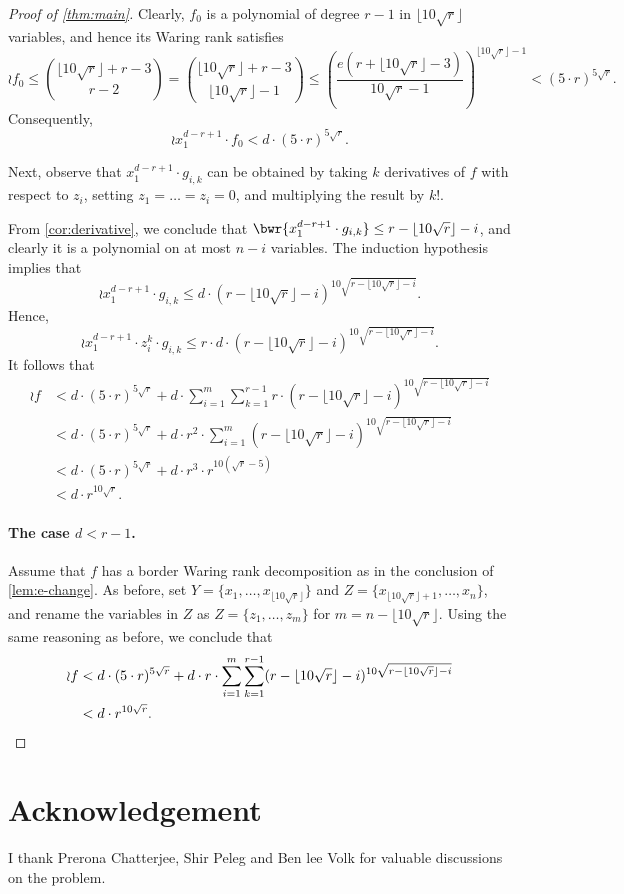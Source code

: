 \documentclass{article}
\begin{document}
\begin{proof}[Proof of \autoref{thm:main}]
    Clearly, $f_0$ is a polynomial of degree $r-1$ in $\lfloor 10\sqrt{r} \rfloor$ variables, and hence its Waring rank satisfies
    \[
    \wr{f_0} \leq \binom{\lfloor 10\sqrt{r} \rfloor + r - 3}{r-2} = \binom{\lfloor 10\sqrt{r} \rfloor + r - 3}{\lfloor 10\sqrt{r} \rfloor - 1} \leq \left(\frac{e(r + \lfloor 10\sqrt{r} \rfloor - 3)}{10\sqrt{r} - 1}\right)^{\lfloor 10\sqrt{r} \rfloor - 1} < (5 \cdot r)^{5\sqrt{r}}.
    \]
    Consequently, 
    \[
    \wr{x_1^{d-r+1} \cdot f_0} < d \cdot (5 \cdot r)^{5\sqrt{r}}.
    \]
 
    Next, observe that $x_1^{d-r+1} \cdot g_{i,k}$ can be obtained by taking $k$ derivatives of $f$ with respect to $z_i$, setting $z_1 = \ldots = z_i = 0$, and multiplying the result by $k!$. 
    
    From \autoref{cor:derivative}, we conclude that $\bwr{x_1^{d-r+1} \cdot g_{i,k}} \leq r - \lfloor 10\sqrt{r} \rfloor - i$, and clearly it is a polynomial on at most $n - i$ variables. The induction hypothesis implies that
    \[
    \wr{x_1^{d-r+1}\cdot  g_{i,k}} \leq d \cdot  (r - \lfloor 10\sqrt{r} \rfloor - i)^{10\sqrt{r - \lfloor 10\sqrt{r} \rfloor - i}}.
    \]
    Hence,
    \[
    \wr{x_1^{d-r+1}\cdot z_i^k\cdot  g_{i,k}} \leq r\cdot d \cdot  (r - \lfloor 10\sqrt{r} \rfloor - i)^{10\sqrt{r - \lfloor 10\sqrt{r} \rfloor - i}}.
    \]
    It follows that    
    \begin{align*}
    \wr{f} &< d \cdot (5 \cdot r)^{5\sqrt{r}} + d \cdot \sum_{i=1}^{m} \sum_{k=1}^{r-1} r\cdot (r - \lfloor 10\sqrt{r} \rfloor - i)^{10\sqrt{r - \lfloor 10\sqrt{r} \rfloor - i}} \\
    &< d \cdot (5 \cdot r)^{5\sqrt{r}} + d \cdot r^2\cdot \sum_{i=1}^{m} (r - \lfloor 10\sqrt{r} \rfloor - i)^{10\sqrt{r - \lfloor 10\sqrt{r} \rfloor - i}} \\
    &< d \cdot (5 \cdot r)^{5\sqrt{r}} + d \cdot r^3 \cdot r^{10(\sqrt{r} - 5)} \\
    &< d \cdot r^{10\sqrt{r}}.
    \end{align*}

    \paragraph{The case $d < r-1$.}
    Assume that $f$ has a border Waring rank decomposition as in the conclusion of \autoref{lem:e-change}. As before, set $Y = \{x_1, \ldots, x_{\lfloor 10\sqrt{r} \rfloor}\}$ and $Z = \{x_{\lfloor 10\sqrt{r} \rfloor+1}, \ldots, x_n\}$, and rename the variables in $Z$ as $Z = \{z_1, \ldots, z_m\}$ for $m = n - \lfloor 10\sqrt{r} \rfloor$. Using the same reasoning as before, we conclude that 
    \begin{align*}
    \wr{f} &< d \cdot (5 \cdot r)^{5\sqrt{r}} + d \cdot r\cdot \sum_{i=1}^{m} \sum_{k=1}^{r-1} (r - \lfloor 10\sqrt{r} \rfloor - i)^{10\sqrt{r - \lfloor 10\sqrt{r} \rfloor - i}} \\
    &< d \cdot r^{10\sqrt{r}}. \qedhere
    \end{align*}
\end{proof}


\section*{Acknowledgement}
I  thank Prerona Chatterjee, Shir Peleg and Ben lee Volk for valuable discussions on the problem.



\end{document}
